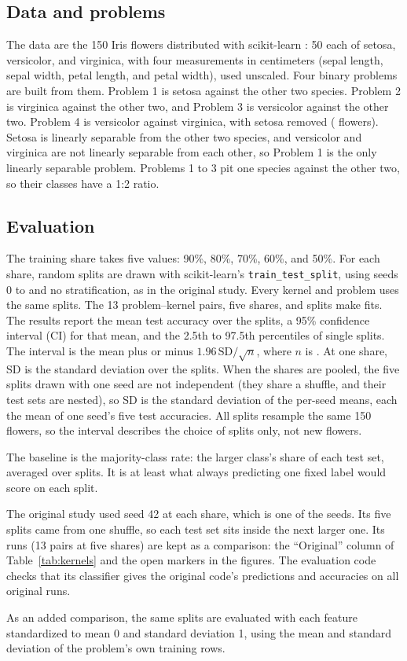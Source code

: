 \subsection{Data and problems}

The data are the 150 Iris flowers distributed with scikit-learn \cite{pedregosa2011}: 50 each of setosa, versicolor, and virginica, with four measurements in centimeters (sepal length, sepal width, petal length, and petal width), used unscaled. Four binary problems are built from them. Problem 1 is setosa against the other two species. Problem 2 is virginica against the other two, and Problem 3 is versicolor against the other two. Problem 4 is versicolor against virginica, with setosa removed ( flowers). Setosa is linearly separable from the other two species, and versicolor and virginica are not linearly separable from each other, so Problem 1 is the only linearly separable problem. Problems 1 to 3 pit one species against the other two, so their classes have a 1:2 ratio.

\subsection{Evaluation}

The training share takes five values: 90\%, 80\%, 70\%, 60\%, and 50\%. For each share,  random splits are drawn with scikit-learn's \texttt{train\_test\_split}, using seeds 0 to  and no stratification, as in the original study. Every kernel and problem uses the same splits. The 13 problem--kernel pairs, five shares, and  splits make  fits. The results report the mean test accuracy over the splits, a 95\% confidence interval (CI) for that mean, and the 2.5th to 97.5th percentiles of single splits. The interval is the mean plus or minus $1.96\,\mathrm{SD}/\sqrt{n}$, where $n$ is . At one share, SD is the standard deviation over the splits. When the shares are pooled, the five splits drawn with one seed are not independent (they share a shuffle, and their test sets are nested), so SD is the standard deviation of the  per-seed means, each the mean of one seed's five test accuracies. All splits resample the same 150 flowers, so the interval describes the choice of splits only, not new flowers.

The baseline is the majority-class rate: the larger class's share of each test set, averaged over splits. It is at least what always predicting one fixed label would score on each split.

The original study used seed 42 at each share, which is one of the  seeds. Its five splits came from one shuffle, so each test set sits inside the next larger one. Its  runs (13 pairs at five shares) are kept as a comparison: the ``Original'' column of Table~\ref{tab:kernels} and the open markers in the figures. The evaluation code checks that its classifier gives the original code's predictions and accuracies on all  original runs.

As an added comparison, the same splits are evaluated with each feature standardized to mean 0 and standard deviation 1, using the mean and standard deviation of the problem's own training rows.
